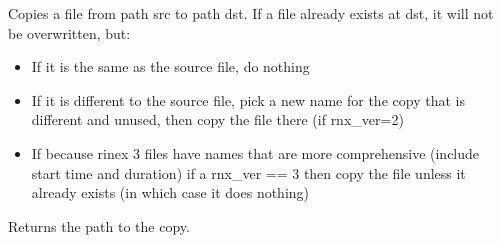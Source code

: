 \documentclass[letterpaper,10pt,english]{sphinxmanual}
\begin{document}
\begin{fulllineitems}
\label{\detokenize{pgamit.classes:pgamit.classes.Utils.copyfile}}
\pysigstartsignatures
\pysiglinewithargsret
{}
{\sphinxparamcomma {}\sphinxparamcomma {}}
{}
\pysigstopsignatures
\sphinxAtStartPar
Copies a file from path src to path dst.
If a file already exists at dst, it will not be overwritten, but:
\begin{itemize}
\item {} 
\sphinxAtStartPar
If it is the same as the source file, do nothing

\item {} 
\sphinxAtStartPar
If it is different to the source file, pick a new name for the copy that
is different and unused, then copy the file there (if rnx\_ver=2)

\item {} 
\sphinxAtStartPar
If because rinex 3 files have names that are more comprehensive (include start time and duration)
if a rnx\_ver == 3 then copy the file unless it already exists (in which case it does nothing)

\end{itemize}

\sphinxAtStartPar
Returns the path to the copy.

\end{fulllineitems}


\begin{fulllineitems}
\label{\detokenize{pgamit.classes:pgamit.classes.Utils.crc32}}
\pysigstartsignatures
\pysiglinewithargsret
{}
{}
{}
\pysigstopsignatures
\end{fulllineitems}


\begin{fulllineitems}
\label{\detokenize{pgamit.classes:pgamit.classes.Utils.ct2lg}}
\pysigstartsignatures
\pysiglinewithargsret
{}
{\sphinxparamcomma {}\sphinxparamcomma {}\sphinxparamcomma {}\sphinxparamcomma {}}
{}
\pysigstopsignatures
\end{fulllineitems}
\end{document}
